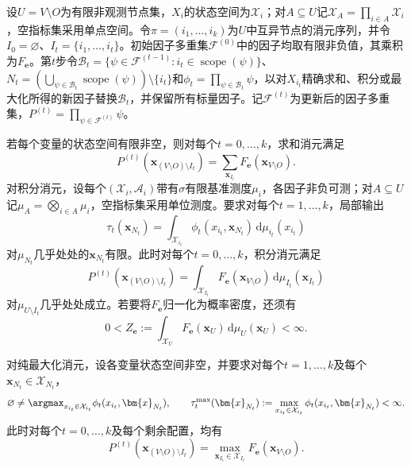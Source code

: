 \begin{theorem}[同类消元的不变式]
  \label{thm:pgm-elimination-invariant}
  设$U=V\setminus O$为有限非观测节点集，$X_i$的状态空间为$\mathcal{X}_i$；对$A\subseteq U$记$\mathcal{X}_A=\prod_{i\in A}\mathcal{X}_i$，空指标集采用单点空间。令$\pi=(i_1,\ldots,i_k)$为$U$中互异节点的消元序列，并令$I_0=\varnothing$、$I_t=\{i_1,\ldots,i_t\}$。初始因子多重集$\mathcal{F}^{(0)}$中的因子均取有限非负值，其乘积为$F_{\bm{e}}$。第$t$步令$\mathcal{B}_t=\{\psi\in\mathcal{F}^{(t-1)}:i_t\in\operatorname{scope}(\psi)\}$、$N_t=(\bigcup_{\psi\in\mathcal{B}_t}\operatorname{scope}(\psi))\setminus\{i_t\}$和$\phi_t=\prod_{\psi\in\mathcal{B}_t}\psi$，以对$X_{i_t}$精确求和、积分或最大化所得的新因子替换$\mathcal{B}_t$，并保留所有标量因子。记$\mathcal{F}^{(t)}$为更新后的因子多重集，$P^{(t)}=\prod_{\psi\in\mathcal{F}^{(t)}}\psi$。

  若每个变量的状态空间有限非空，则对每个$t=0,\ldots,k$，求和消元满足
  \[
    P^{(t)}(\bm{x}_{(V\setminus O)\setminus I_t})
    =\sum_{\bm{x}_{I_t}}F_{\bm{e}}(\bm{x}_{V\setminus O}).
  \]
  对积分消元，设每个$(\mathcal{X}_i,\mathcal{A}_i)$带有$\sigma$有限基准测度$\mu_i$，各因子非负可测；对$A\subseteq U$记$\mu_A=\bigotimes_{i\in A}\mu_i$，空指标集采用单位测度。要求对每个$t=1,\ldots,k$，局部输出
  \[
    \tau_t(\bm{x}_{N_t})
      =\int_{\mathcal{X}_{i_t}}
         \phi_t(x_{i_t},\bm{x}_{N_t})\,\mathrm{d}\mu_{i_t}(x_{i_t})
  \]
  对$\mu_{N_t}$几乎处处的$\bm{x}_{N_t}$有限。此时对每个$t=0,\ldots,k$，积分消元满足
  \[
    P^{(t)}(\bm{x}_{(V\setminus O)\setminus I_t})
    =\int_{\mathcal{X}_{I_t}}
       F_{\bm{e}}(\bm{x}_{V\setminus O})\,
       \mathrm{d}\mu_{I_t}(\bm{x}_{I_t})
  \]
  对$\mu_{U\setminus I_t}$几乎处处成立。若要将$F_{\bm e}$归一化为概率密度，还须有
  \[
    0<Z_{\bm e}\mathrel{:=}
      \int_{\mathcal{X}_U}F_{\bm e}(\bm{x}_U)\,
      \mathrm{d}\mu_U(\bm{x}_U)<\infty.
  \]

  对纯最大化消元，设各变量状态空间非空，并要求对每个$t=1,\ldots,k$及每个$\bm{x}_{N_t}\in\mathcal{X}_{N_t}$，
  \[
    \varnothing\neq
    \argmax_{x_{i_t}\in\mathcal{X}_{i_t}}
      \phi_t(x_{i_t},\bm{x}_{N_t}),
    \qquad
    \tau_t^{\max}(\bm{x}_{N_t})
      \mathrel{:=}\max_{x_{i_t}\in\mathcal{X}_{i_t}}
        \phi_t(x_{i_t},\bm{x}_{N_t})<\infty.
  \]
  此时对每个$t=0,\ldots,k$及每个剩余配置，均有
  \[
    P^{(t)}(\bm{x}_{(V\setminus O)\setminus I_t})
    =\max_{\bm{x}_{I_t}\in\mathcal{X}_{I_t}}
       F_{\bm{e}}(\bm{x}_{V\setminus O}).
  \]
\end{theorem}

